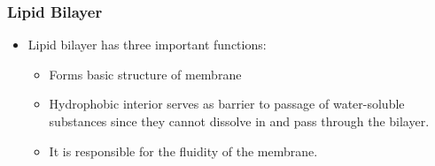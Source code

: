 \documentclass{article}
\numberwithin{equation}{section}
\begin{document}
\subsubsection{Lipid Bilayer}
\begin{itemize}
    \item Lipid bilayer has three important functions:
    \begin{itemize}
        \item Forms basic structure of membrane
        \item Hydrophobic interior serves as barrier to passage of water-soluble substances since they cannot dissolve in and pass through the bilayer.
        \item It is responsible for the fluidity of the membrane.
    \end{itemize}
\end{itemize}
\end{document}
